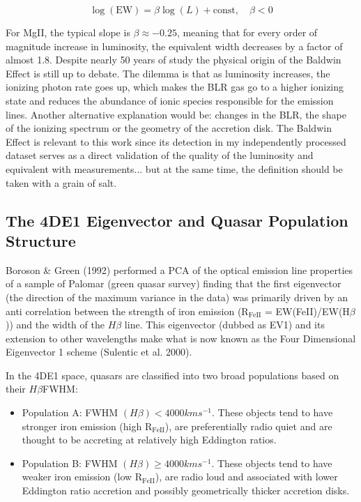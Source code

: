 \documentclass[11pt,a4paper]{article}
\begin{document}
$$\log(\text{EW}) = \beta \log(L) + \text{const}, \quad \beta < 0$$

For MgII, the typical slope is $\beta \approx -0.25$, meaning that for every order of magnitude increase in luminosity, the equivalent width decreases by a factor of almost 1.8. Despite nearly 50 years of study the physical origin of the Baldwin Effect is still up to debate. The dilemma is that as luminosity increases, the ionizing photon rate goes up, which makes the BLR gas go to a higher ionizing state and reduces the abundance of ionic species responsible for the emission lines. Another alternative explanation would be: changes in the BLR, the shape of the ionizing spectrum or the geometry of the accretion disk. The Baldwin Effect is relevant to this work since its detection in my independently processed dataset serves as a direct validation of the quality of the luminosity and equivalent with measurements... but at the same time, the definition should be taken with a grain of salt.

\subsection{The 4DE1 Eigenvector and Quasar Population Structure}
Boroson \& Green (1992) performed a PCA of the optical emission line properties of a sample of Palomar (green quasar survey) finding that the first eigenvector (the direction of the maximum variance in the data) was primarily driven by an anti correlation between the strength of iron emission (R$_\text{FeII}$ = EW(FeII)/EW(H$\beta$)) and the width of the $H \beta$ line. This eigenvector (dubbed as EV1) and its extension to other wavelengths make what is now known as the Four Dimensional Eigenvector 1 scheme (Sulentic et al. 2000).

In the 4DE1 space, quasars are classified into two broad populations based on their $H \beta$FWHM:
\begin{itemize}
    \item Population A: FWHM $(H \beta)<4000kms^{-1}$. These objects tend to have stronger iron emission (high R$_\text{FeII}$), are preferentially radio quiet and are thought to be accreting at relatively high Eddington ratios.
    \item Population B:  FWHM $(H \beta)\geq4000kms^{-1}$. These objects tend to have weaker iron emission  (low R$_\text{FeII}$), are radio loud and associated with lower Eddington ratio accretion and possibly geometrically thicker accretion disks.
\end{itemize}
\end{document}
